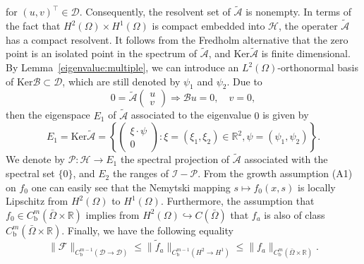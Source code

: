 \documentclass{elsarticle}
\begin{document}
for $(u, v)^\top\in\mathcal{D}$.
Consequently, the resolvent set of $\tilde{\mathcal{A}}$ is nonempty. In terms of the fact that $H^2(\Omega)\times H^1(\Omega)$ is compact embedded into $\mathcal{H}$, the operater $\tilde{\mathcal{A}}$ has a compact resolvent. It follows from the Fredholm alternative that the zero point is an isolated point in the spectrum of $\tilde{\mathcal{A}}$, and $\mathrm{Ker}\tilde{\mathcal{A}}$ is finite dimensional.  
By Lemma~\ref{eigenvalue:multiple}, we can introduce an $L^2(\Omega)$-orthonormal basis of $\mathrm{Ker}\mathcal{B}\subset \mathcal{D}$, which are still denoted by $\psi_1$ and $\psi_2$. Due to
 \begin{equation*}
 0=
\tilde{\mathcal{A}}\left(
\begin{array}{c}
u \\
v
\end{array}
\right)
\Longrightarrow
\mathcal{B}u=0, \quad v=0,
\end{equation*}
then the eigenspace $E_1$ of $\tilde{\mathcal{A}}$ associated to the eigenvalue $0$ is given by
\[
E_1= \mathrm{Ker}\tilde{\mathcal{A}} = 
\left\{
\left(
\begin{array}{c}
\xi\cdot\psi \\
0
\end{array}
\right):
\xi = (\xi_1, \xi_2)\in\mathbb{R}^2, \psi = (\psi_1, \psi_2)
\right\}.
\]
We denote by $\mathcal{P}: \mathcal{H}\rightarrow E_1$ the spectral projection of $\tilde{\mathcal{A}}$ associated with the spectral set $\{0\}$, and $E_2$ the ranges of $\mathcal{I}-\mathcal{P}$. 
From the growth assumption (A1) on $f_0$ one can easily see that the Nemytski mapping $s\mapsto f_0(x, s)$ is locally Lipschitz from $H^2(\Omega)$ to $H^1(\Omega)$. Furthermore, the assumption that $f_0\in C^m_{\mathrm{b}}(\bar{\Omega}\times\mathbb{R})$ implies from $H^2(\Omega)\hookrightarrow  C(\bar{\Omega})$ that $f_a$ is also of class $C^m_{\mathrm{b}}(\bar{\Omega}\times\mathbb{R})$. Finally, we have the following equality
\[
	\|\mathcal{F}\|_{C^{m-1}_{\mathrm{b}}(\mathcal{D}\rightarrow \mathcal{D})}\leqslant \|\tilde{f}_a\|_{C^{m-1}_{\mathrm{b}}(H^2\rightarrow H^1)} \leqslant \|f_a\|_{C^m_{\mathrm{b}}(\bar{\Omega}\times \mathbb{R})}. 
\]
\end{document}
